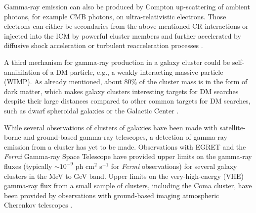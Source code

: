 \documentclass[12pt,manuscript]{aastex}
\def\Fermi{{\em Fermi}\xspace}
\begin{document}
Gamma-ray emission can also be produced by Compton up-scattering of ambient photons, for example
CMB photons, on ultra-relativistic electrons. Those electrons can either be secondaries from the
above mentioned CR interactions or injected into the ICM by powerful cluster members and
further accelerated by diffusive shock acceleration or turbulent reacceleration processes
\citep[][and references therein]{article:SchlickeiserSieversThiemann:1987}.

A third mechanism for gamma-ray production in a galaxy cluster could be self-annihilation of a DM
particle, e.g., a weakly interacting massive particle (WIMP). As already mentioned, about 80\% of
the cluster mass is in the form of dark matter, which makes galaxy clusters interesting targets for
DM searches \citep{article:EvansFerrerSarkar:2004, article:BergstromHooper:2006,
article:PinzkePfrommerBergstrom2009, article:Cuesta_etal:2011} despite their large distances
compared to other common targets for DM searches, such as dwarf spheroidal galaxies
\citep{article:Strigari_etal:2007, article:Acciari_etal:2010, article:Aliu_etal:2009} or the
Galactic Center \citep{article:Kosack_etal:2004, article:Aharonian_etal:2006,
article:Aharonian_etal:2009b, article:Abramowski_etal:2011}. 

While several observations of clusters of galaxies have been made with satellite-borne and
ground-based gamma-ray telescopes, a detection of gamma-ray emission from a cluster has yet to be
made. Observations with EGRET \citep{article:Sreekumar_etal:1996, article:Reimer_etal:2003} and the
\Fermi Gamma-ray Space Telescope \citep{article:Ackermann_etal:2010} have provided upper limits on
the gamma-ray fluxes (typically $\sim10^{-9}$ ph cm$^{2}$ s$^{-1}$ for \Fermi observations) for
several galaxy clusters in the MeV to GeV band. Upper limits on the very-high-energy (VHE)
gamma-ray flux from a small sample of clusters, including the Coma cluster, have been provided by
observations with ground-based imaging atmospheric Cherenkov telescopes
\citep[IACTs;][]{article:Perkins_etal:2006, inproc:Perkins_etal:2008, article:Aharonian_etal:2009a,
article:Aleksic_etal:2010}.
\end{document}
